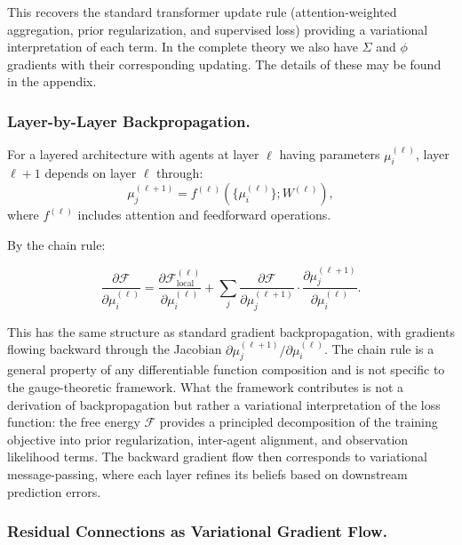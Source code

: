 \documentclass[twoside,11pt]{article}
\begin{document}
This recovers the standard transformer update rule (attention-weighted aggregation, prior regularization, and supervised loss) providing a variational interpretation of each term.  In the complete theory we also have $\Sigma$ and $\phi$ gradients with their corresponding updating.  The details of these may be found in the appendix.

\subsubsection{Layer-by-Layer Backpropagation.}

For a layered architecture with agents at layer $\ell$ having parameters $\mu_i^{(\ell)}$, layer $\ell+1$ depends on layer $\ell$ through:
\begin{equation}
\mu_j^{(\ell+1)} = f^{(\ell)}(\{\mu_i^{(\ell)}\}; W^{(\ell)}),
\end{equation}
where $f^{(\ell)}$ includes attention and feedforward operations.

By the chain rule:

\begin{equation}
\frac{\partial \mathcal{F}}{\partial \mu_i^{(\ell)}} = \frac{\partial \mathcal{F}_{\text{local}}^{(\ell)}}{\partial \mu_i^{(\ell)}} + \sum_j \frac{\partial \mathcal{F}}{\partial \mu_j^{(\ell+1)}} \cdot \frac{\partial \mu_j^{(\ell+1)}}{\partial \mu_i^{(\ell)}}.
\end{equation}

This has the same structure as standard gradient backpropagation, with gradients flowing backward through the Jacobian $\partial \mu_j^{(\ell+1)}/\partial \mu_i^{(\ell)}$. The chain rule is a general property of any differentiable function composition and is not specific to the gauge-theoretic framework. What the framework contributes is not a derivation of backpropagation but rather a variational interpretation of the loss function: the free energy $\mathcal{F}$ provides a principled decomposition of the training objective into prior regularization, inter-agent alignment, and observation likelihood terms. The backward gradient flow then corresponds to variational message-passing, where each layer refines its beliefs based on downstream prediction errors.

\subsubsection{Residual Connections as Variational Gradient Flow.}
\label{sec:residual_connections}
\end{document}
